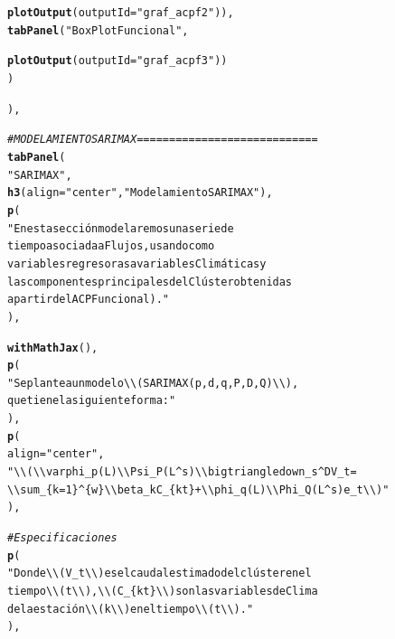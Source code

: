 \documentclass[12pt,oneside]{book}\usepackage[]{graphicx}\usepackage[]{color}
\makeatletter
\newcommand{\hlstr}[1]{\textcolor[rgb]{0.192,0.494,0.8}{#1}}%
\newcommand{\hlcom}[1]{\textcolor[rgb]{0.678,0.584,0.686}{\textit{#1}}}%
\newcommand{\hlstd}[1]{\textcolor[rgb]{0.345,0.345,0.345}{#1}}%
\newcommand{\hlkwc}[1]{\textcolor[rgb]{0.333,0.667,0.333}{#1}}%
\newcommand{\hlkwd}[1]{\textcolor[rgb]{0.737,0.353,0.396}{\textbf{#1}}}%
\newenvironment{kframe}{%
 \def\at@end@of@kframe{}%
 \ifinner\ifhmode%
  \def\at@end@of@kframe{\end{minipage}}%
  \begin{minipage}{\columnwidth}%
 \fi\fi%
 \def\FrameCommand##1{\hskip\@totalleftmargin \hskip-\fboxsep
 \colorbox{shadecolor}{##1}\hskip-\fboxsep
     \hskip-\linewidth \hskip-\@totalleftmargin \hskip\columnwidth}%
 \MakeFramed {\advance\hsize-\width
   \@totalleftmargin\z@ \linewidth\hsize
   \@setminipage}}%
 {\par\unskip\endMakeFramed%
 \at@end@of@kframe}
\newenvironment{knitrout}{}{} %
\theoremstyle{definition} %
\makeatother
\begin{document}
\begin{knitrout}
\begin{kframe}
\begin{alltt}
                 \hlkwd{plotOutput}\hlstd{(}\hlkwc{outputId} \hlstd{=} \hlstr{"graf_acpf2"}\hlstd{)),}
        \hlkwd{tabPanel}\hlstd{(}\hlstr{"BoxPlot Funcional"}\hlstd{,}

                 \hlkwd{plotOutput}\hlstd{(}\hlkwc{outputId} \hlstd{=} \hlstr{"graf_acpf3"}\hlstd{))}
      \hlstd{)}

      \hlstd{),}

    \hlcom{# MODELAMIENTO SARIMAX   ============================}
    \hlkwd{tabPanel}\hlstd{(}
      \hlstr{"SARIMAX"}\hlstd{,}
      \hlkwd{h3}\hlstd{(}\hlkwc{align} \hlstd{=} \hlstr{"center"}\hlstd{,} \hlstr{"Modelamiento SARIMAX"}\hlstd{),}
      \hlkwd{p}\hlstd{(}
        \hlstr{"En esta sección modelaremos una serie de
        tiempo asociada a Flujos, usando como
        variables regresoras a variables Climáticas y
        las componentes principales del Clúster obtenidas
        a partir del ACP Funcional)."}
    \hlstd{),}


    \hlkwd{withMathJax}\hlstd{(),}
    \hlkwd{p}\hlstd{(}
      \hlstr{"Se plantea un modelo \textbackslash{}\textbackslash{}(SARIMAX(p,d,q,P,D,Q) \textbackslash{}\textbackslash{}),
      que tiene la siguiente forma:"}
    \hlstd{),}
    \hlkwd{p}\hlstd{(}
      \hlkwc{align} \hlstd{=} \hlstr{"center"}\hlstd{,}
      \hlstr{"\textbackslash{}\textbackslash{}( \textbackslash{}\textbackslash{}varphi_p(L)\textbackslash{}\textbackslash{}Psi_P(L^s) \textbackslash{}\textbackslash{}bigtriangledown _s^D V_t =
      \textbackslash{}\textbackslash{}sum_\{k=1\}^\{w\}\textbackslash{}\textbackslash{}beta_k C_\{kt\} + \textbackslash{}\textbackslash{}phi_q(L) \textbackslash{}\textbackslash{}Phi_Q(L^s)e_t \textbackslash{}\textbackslash{})"}
    \hlstd{),}

    \hlcom{#Especificaciones}
    \hlkwd{p}\hlstd{(}
      \hlstr{"Donde \textbackslash{}\textbackslash{}(V_t\textbackslash{}\textbackslash{}) es el caudal estimado del clúster en el
      tiempo \textbackslash{}\textbackslash{}(t\textbackslash{}\textbackslash{}), \textbackslash{}\textbackslash{}(C_\{kt\}\textbackslash{}\textbackslash{}) son las variables de Clima
      de la estación \textbackslash{}\textbackslash{}(k\textbackslash{}\textbackslash{}) en el tiempo \textbackslash{}\textbackslash{}(t\textbackslash{}\textbackslash{})."}
    \hlstd{),}



\end{alltt}
\end{kframe}
\end{knitrout}
\end{document}
